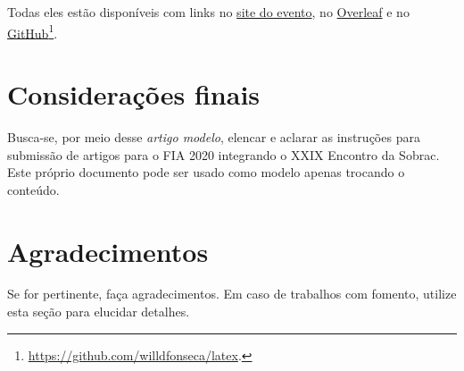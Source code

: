 \documentclass[12pt, a4paper, twoside, twocolumn]{article}
\begin{document}

Todas eles estão disponíveis com links no \href{http://fia2020.com.br}{site do evento}, no \href{https://www.overleaf.com/read/rnfjxkknksnd}{Overleaf} e no \href{https://github.com/willdfonseca/latex}{GitHub}\footnote{\url{https://github.com/willdfonseca/latex}.}.

\section{Considerações finais}

Busca-se, por meio desse \textit{artigo modelo}, elencar e aclarar as instruções para submissão de artigos para o FIA 2020 integrando o XXIX Encontro da Sobrac. 
Este próprio documento pode ser usado como modelo apenas trocando o conteúdo.

\section{Agradecimentos}

Se for pertinente, faça agradecimentos.
%
Em caso de trabalhos com fomento, utilize esta seção para elucidar detalhes.
\end{document}
